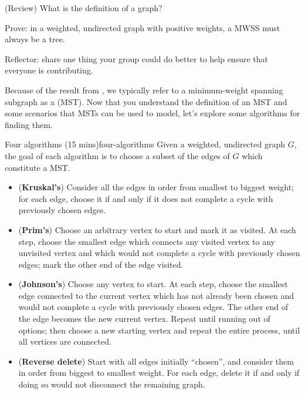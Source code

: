 \documentclass{tufte-handout}
\begin{document}
\begin{questions}
\item (Review) What is the definition of a  graph?
\item \label{q:mwss-tree} Prove: in a weighted, undirected graph with
  positive weights, a MWSS must always be a tree. 
  \vspace{2in}
\item Reflector: share one thing your group could do better to help
  ensure that everyone is contributing.
\end{questions}

\pause

Because of the result from , we typically refer to
a minimum-weight spanning subgraph as a 
(MST).  Now that you understand the definition of an MST and some
scenarios that MSTs can be used to model, let's explore some
algorithms for finding them.

\begin{model*}{Four algorithms (15 mins)}{four-algorithms}
  Given a weighted, undirected graph $G$, the goal of each algorithm
  is to choose a subset of the edges of $G$ which constitute a MST.
  \begin{itemize}
  \item (\textbf{Kruskal's}) Consider all the edges in order from
    smallest to biggest weight; for each edge, choose it if and only if
    it does not complete a cycle with previously chosen edges.
  \item (\textbf{Prim's}) Choose an arbitrary vertex to start and mark
    it as visited.  At each step, choose the smallest edge which
    connects any visited vertex to any unvisited vertex and which would
    not complete a cycle with previously chosen edges; mark the other
    end of the edge visited.
  \item (\textbf{Johnson's}) Choose any vertex to start.  At each
    step, choose the smallest edge connected to the current vertex which
    has not already been chosen and would not complete a cycle with
    previously chosen edges.  The other end of the edge becomes the
    new current vertex.  Repeat until running out of options; then
    choose a new starting vertex and repeat the entire process, until
    all vertices are connected.
  \item (\textbf{Reverse delete}) Start with all edges initially
    ``chosen'', and consider them in order from biggest to smallest
    weight.  For each edge, delete it if and only if doing so would
    not disconnect the remaining graph.
  \end{itemize}
\end{model*}
\end{document}

